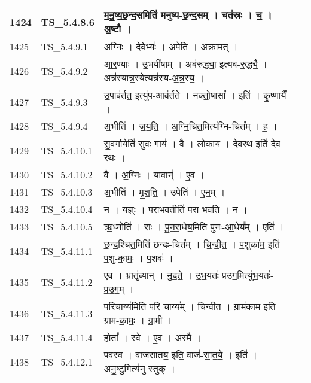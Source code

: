 \documentclass[17pt]{extarticle}
\begin{document}
\begin{longtable}{||p{0.4in}||p{0.9in}||p{4.0in}||p{0.9in}||}
        \hline
            1424 & TS\_5.4.8.6 & म॒नु॒ष्य॒छ॒न्द॒समिति॑ मनुष्य{-}छ॒न्द॒सम्   ।   चत॑स्रः   ।   च॒   ।   अ॒ष्टौ   ।    &      \\
        \hline
            1425 & TS\_5.4.9.1 & अ॒ग्निः   ।   दे॒वेभ्यः॑   ।   अपेति॑   ।   अ॒क्रा॒म॒त्   ।    &      \\
        \hline
            1426 & TS\_5.4.9.2 & आ॒र॒ण्याः   ।   उ॒भयी॑षाम्   ।   अव॑रुद्ध्या॒ इत्यव॑{-}रु॒द्ध्यै॒   ।   अन्न॑स्यान्न॒स्येत्यन्न॑स्य{-}अ॒न्न॒स्य॒   ।    &      \\
        \hline
            1427 & TS\_5.4.9.3 & उ॒पाव॑र्तत॒ इत्यु॑प{-}आव॑र्तते   ।   नक्तो॒षासा᳚   ।   इति॑   ।   कृ॒ष्णायै᳚   ।    &      \\
        \hline
            1428 & TS\_5.4.9.4 & अ॒भीति॑   ।   ज॒य॒ति॒   ।   अ॒ग्नि॒चित॒मित्य॑ग्नि{-}चित᳚म्   ।   ह॒   ।    &      \\
        \hline
            1429 & TS\_5.4.10.1 & सु॒व॒र्गायेति॑ सुवः{-}गाय॑   ।   वै   ।   लो॒काय॑   ।   दे॒व॒र॒थ इति॑ देव{-}र॒थः   ।    &      \\
        \hline
            1430 & TS\_5.4.10.2 & वै   ।   अ॒ग्निः   ।   यावान्॑   ।   ए॒व   ।    &      \\
        \hline
            1431 & TS\_5.4.10.3 & अ॒भीति॑   ।   मृ॒श॒ति॒   ।   उपेति॑   ।   ए॒न॒म्   ।    &      \\
        \hline
            1432 & TS\_5.4.10.4 & न   ।   य॒ज्ञ्ः   ।   प॒रा॒भव॒तीति॑ परा{-}भव॑ति   ।   न   ।    &      \\
        \hline
            1433 & TS\_5.4.10.5 & ऋ॒ध्नोति॑   ।   सः   ।   पु॒न॒रा॒धेय॒मिति॑ पुनः{-}आ॒धेय᳚म्   ।   एति॑   ।    &      \\
        \hline
            1434 & TS\_5.4.11.1 & छ॒न्द॒श्चित॒मिति॑ छन्दः{-}चित᳚म्   ।   चि॒न्वी॒त॒   ।   प॒शुका॑म॒ इति॑ प॒शु{-}का॒मः॒   ।   प॒शवः॑   ।    &      \\
        \hline
            1435 & TS\_5.4.11.2 & ए॒व   ।   भ्रातृ॑व्यान्   ।   नु॒द॒ते॒   ।   उ॒भ॒यतः॑ प्र‌उग॒मित्यु॑भ॒यतः॑{-}प्र॒उ॒ग॒म्   ।    &      \\
        \hline
            1436 & TS\_5.4.11.3 & प॒रि॒चा॒य्य॑मिति॑ परि{-}चा॒य्य᳚म्   ।   चि॒न्वी॒त॒   ।   ग्राम॑काम॒ इति॒ ग्राम॑{-}का॒मः॒   ।   ग्रा॒मी   ।    &      \\
        \hline
            1437 & TS\_5.4.11.4 & होता᳚   ।   स्वे   ।   ए॒व   ।   अ॒स्मै॒   ।    &      \\
        \hline
            1438 & TS\_5.4.12.1 & पव॑स्व   ।   वाज॑सातय॒ इति॒ वाज॑{-}सा॒त॒ये॒   ।   इति॑   ।   अ॒नु॒ष्टुगित्य॑नु{-}स्तुक्   ।    &      \\

\end{longtable}
\end{document}
